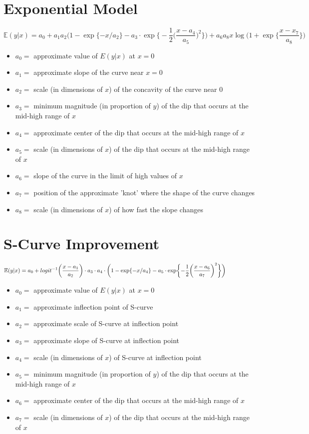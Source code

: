 \documentclass[12pt]{article}
\begin{document}

\def\ci{\perp\!\!\!\perp}
\def\ex{\mathbb{E}}
\def\prob{\mathbb{P}}
\def\ind{\mathbb{I}}
\def\grad{\triangledown}
\def\bigo{\mathcal{O}}

\section{Exponential Model}

$$ \ex(y|x) = a_0 + a_1 a_2 \biggl(1-\exp\{-x/a_2\}-a_3 \cdot \exp\biggl\{-\frac{1}{2}\biggl(\frac{x-a_4}{a_5}\biggr)^2\biggr\} \biggr) + a_6 a_8x  \log\biggl(1+\exp\biggl\{\frac{x-x_7}{a_8} \biggr\}\biggr) $$
\begin{itemize}
\item $a_0 =$ approximate value of $E(y|x)$ at $x=0$
\item $a_1 =$ approximate slope of the curve near $x=0$
\item $a_2 =$ scale (in dimensions of $x$) of the concavity of the curve near $0$
\item $a_3 =$ minimum magnitude (in proportion of $y$) of the dip that occurs at the mid-high range of $x$
\item $a_4 =$ approximate center of the dip that occurs at the mid-high range of $x$
\item $a_5 =$ scale (in dimensions of $x$) of the dip that occurs at the mid-high range of $x$
\item $a_6 =$ slope of the curve in the limit of high values of $x$
\item $a_7 =$ position of the approximate 'knot' where the shape of the curve changes
\item $a_8 =$ scale (in dimensions of $x$) of how fast the slope changes
\end{itemize}

\section{S-Curve Improvement}

$$ \ex(y|x) = a_0 + logit^{-1}\biggl(\frac{x-a_1}{a_2}\biggr) \cdot a_3 \cdot a_4 \cdot \biggl(1-\exp\{-x/a_4\}-a_5 \cdot \exp\biggl\{-\frac{1}{2}\biggl(\frac{x-a_6}{a_7}\biggr)^2\biggr\} \biggr) \hspace{50 pt}$$
\begin{itemize}
\item $a_0 =$ approximate value of $E(y|x)$ at $x=0$
\item $a_1 =$ approximate inflection point of S-curve
\item $a_2 =$ approximate scale of S-curve at inflection point
\item $a_3 =$ approximate slope of S-curve at inflection point
\item $a_4 =$ scale (in dimensions of $x$) of S-curve at inflection point
\item $a_5 =$ minimum magnitude (in proportion of $y$) of the dip that occurs at the mid-high range of $x$
\item $a_6 =$ approximate center of the dip that occurs at the mid-high range of $x$
\item $a_7 =$ scale (in dimensions of $x$) of the dip that occurs at the mid-high range of $x$
\end{itemize}
\end{document}
